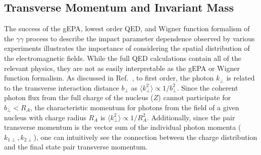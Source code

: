 \documentclass[12pt,epjc3]{svjour3}\sloppy
\begin{document}
\subsection{Transverse Momentum and Invariant Mass}
The success of the gEPA, lowest order QED, and Wigner function formalism of the $\gamma\gamma$ process to describe the impact parameter dependence observed by various experiments illustrates the importance of considering the spatial distribution of the electromagnetic fields. 
While the full QED calculations contain all of the relevant physics, they are not as easily interpretable as the gEPA or Wigner function formalism. 
As discussed in Ref.~\cite{kleinLeptonPairProduction2020a}, to first order, the photon $k_\perp$ is related to the transverse interaction distance $b_\perp$ as $\langle k_\perp^2 \rangle \propto 1/b_\perp^2$. 
Since the coherent photon flux from the full charge of the nucleus ($Z$) cannot participate for $b_\perp < R_A$, the characteristic momentum for photons from the field of a given nucleus with charge radius $R_A$ is $\langle k_\perp^2 \rangle \propto 1 / R_A^2$.
Additionally, since the pair transverse momentum is the vector sum of the individual photon momenta ($k_{1\perp}, k_{2\perp}$), one can intuitively see the connection between the charge distribution and the final state pair transverse momentum. 
\end{document}
